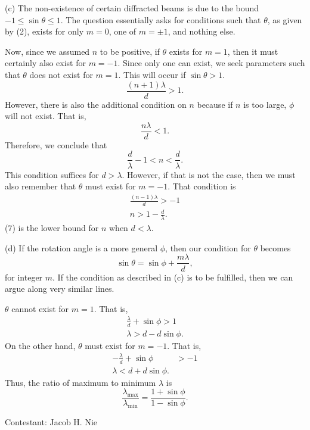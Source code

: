 \documentclass[12pt]{article}
\begin{document}
\vspace{1cm}

\noindent (c) The non-existence of certain diffracted beams is due to the bound $-1 \leq \sin \theta \leq 1$.  The question essentially asks for conditions such that $\theta$, as given by (2), exists for only $m=0$, one of $m=\pm 1$, and nothing else.  

Now, since we assumed $n$ to be positive, if $\theta$ exists for $m = 1$, then it must certainly also exist for $m = -1$.  Since only one can exist, we seek parameters such that $\theta$ does not exist for $m = 1$.  This will occur if $\sin \theta > 1$.  
\begin{equation}
	\frac{(n+1)\lambda }{d} > 1.
\end{equation}
However, there is also the additional condition on $n$ because if $n$ is too large, $\phi$ will not exist.  That is,
\begin{equation}
	\frac{n\lambda }{d} < 1.
\end{equation}
Therefore, we conclude that
\begin{equation}
\frac{d}{\lambda} - 1 < n < \frac{d}{\lambda}.	
\end{equation}
This condition suffices for $d > \lambda$.  However, if that is not the case, then we must also remember that $\theta$ must exist for $m = -1$.  That condition is
\begin{align}
	\frac{(n-1)\lambda}{d} > -1 \nonumber \\
	n > 1 - \frac{d}{\lambda}.
\end{align}
(7) is the lower bound for $n$ when $d < \lambda$.  

\vspace{1cm}

\noindent (d) If the rotation angle is a more general $\phi$, then our condition for $\theta$ becomes
\begin{equation}
	\sin \theta = \sin \phi + \frac{m\lambda}{d},
\end{equation}
for integer $m$.  If the condition as described in (c) is to be fulfilled, then we can argue along very similar lines.  

$\theta$ cannot exist for $m = 1$.  That is,
\begin{align}
	\frac{\lambda}{d} + \sin \phi > 1 \nonumber \\
	\lambda > d - d\sin \phi.
\end{align}
On the other hand,  $\theta$ must exist for $m = -1$.  That is,
\begin{align}
	-\frac{\lambda}{d} + \sin \phi &> - 1 \nonumber \\
	\lambda < d + d\sin\phi.
\end{align}
Thus, the ratio of maximum to minimum $\lambda$ is
\begin{equation}
	\frac{\lambda_{\text{max}}}{\lambda_{\text{min}}} = \frac{1 + \sin\phi}{1 - \sin\phi}.
\end{equation}


\vspace{1cm}

\hfill Contestant: Jacob H. Nie
\end{document}
